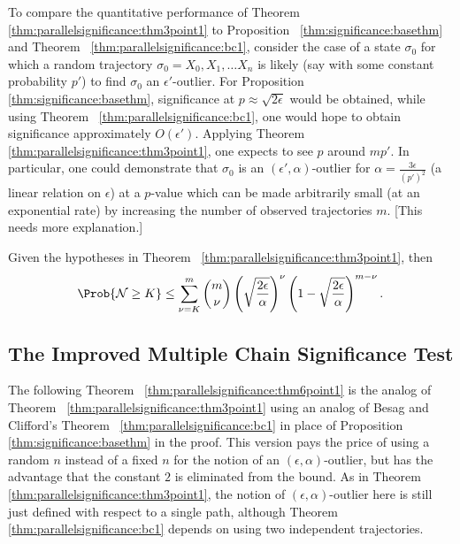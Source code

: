 \documentclass[12pt]{article}
\begin{document}
\begin{example}
    To compare the quantitative performance of Theorem~%
    \ref{thm:parallelsignificance:thm3point1} to Proposition~%
    \ref{thm:significance:basethm} and Theorem~%
    \ref{thm:parallelsignificance:bc1}, consider the case of a state \(
    \sigma_0 \) for which a random trajectory \( \sigma_0 = X_0 , X_1 ,
    \dots X_n \) is likely (say with some constant probability \( p' \))
    to find \( \sigma_0 \) an \( \epsilon' \)-outlier.  For Proposition~%
    \ref{thm:significance:basethm}, significance at \( p \approx \sqrt{2\epsilon}
    \) would be obtained, while using Theorem~%
    \ref{thm:parallelsignificance:bc1}, one would hope to obtain
    significance approximately \( O(\epsilon') \).  Applying Theorem~%
    \ref{thm:parallelsignificance:thm3point1}, one expects to see \( p \)
    around \( m p' \).  In particular, one could demonstrate that \(
    \sigma_0 \) is an \( (\epsilon', \alpha) \)-outlier for \( \alpha =
    \frac{3\epsilon} {(p')^2} \) (a linear relation on \( \epsilon \))
    at a \( p \)-value which can be made arbitrarily small (at an
    exponential rate) by increasing the number of observed trajectories \(
    m \).  [This needs more explanation.]
\end{example}

\begin{corollary}
    Given the hypotheses in Theorem~%
    \ref{thm:parallelsignificance:thm3point1}, then
    \[
        \Prob{\mathcal{N} \ge K} \le \sum\limits_{\nu=K}^m \binom{m}{\nu}
        \left( \sqrt{\frac{2\epsilon}{\alpha}} \right)^{\nu} \left( 1 -
        \sqrt{\frac{2\epsilon}{\alpha}} \right)^{m-\nu}.
    \]
\end{corollary}

\subsection*{The Improved Multiple Chain Significance Test}

The following Theorem~%
\ref{thm:parallelsignificance:thm6point1} is the analog of Theorem~%
\ref{thm:parallelsignificance:thm3point1} using an analog of Besag and
Clifford's Theorem~%
\ref{thm:parallelsignificance:bc1} in place of Proposition~%
\ref{thm:significance:basethm} in the proof.  This version pays the
price of using a random \( n \) instead of a fixed \( n \) for the
notion of an \( (\epsilon, \alpha) \)-outlier, but has the advantage
that the constant \( 2 \) is eliminated from the bound.  As in Theorem~%
\ref{thm:parallelsignificance:thm3point1}, the notion of \( (\epsilon,
\alpha) \)-outlier here is still just defined with respect to a single
path, although Theorem~%
\ref{thm:parallelsignificance:bc1} depends on using two independent
trajectories.
\end{document}
